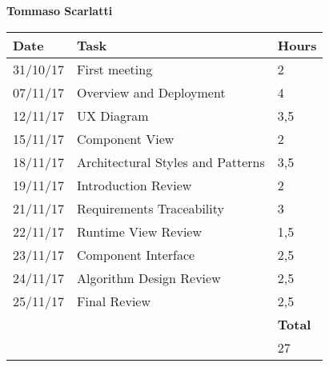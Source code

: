 \newpage
\noindent
\textbf{Tommaso Scarlatti}\\

\begin{tabular}{| l | l | l |}
	\hline
	\textbf{Date} & \textbf{Task} & \textbf{Hours}\\
	\hline
	31/10/17 & First meeting & 2\\
	07/11/17 & Overview and Deployment & 4\\
	12/11/17 & UX Diagram & 3,5\\
	15/11/17 & Component View & 2\\
	18/11/17 & Architectural Styles and Patterns & 3,5\\
	19/11/17 & Introduction Review & 2\\
	21/11/17 & Requirements Traceability & 3\\
	22/11/17 & Runtime View Review & 1,5\\
	23/11/17 & Component Interface & 2,5\\
	24/11/17 & Algorithm Design Review & 2,5\\
	25/11/17 & Final Review & 2,5\\
	\hline
	& & \textbf{Total}\\
	\hline
	& & 27\\	
	\hline
	
\end{tabular}